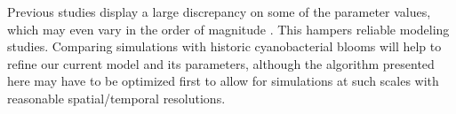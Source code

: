 \documentclass{article}
\begin{document}
Previous studies display a large discrepancy on some of the parameter values, which may even vary in the order of magnitude \cite{B}. This hampers reliable modeling studies. Comparing simulations with historic cyanobacterial blooms will help to refine our current model and its parameters, although the algorithm presented here may have to be optimized first to allow for simulations at such scales with reasonable spatial/temporal resolutions.

\printbibliography
\end{document}
